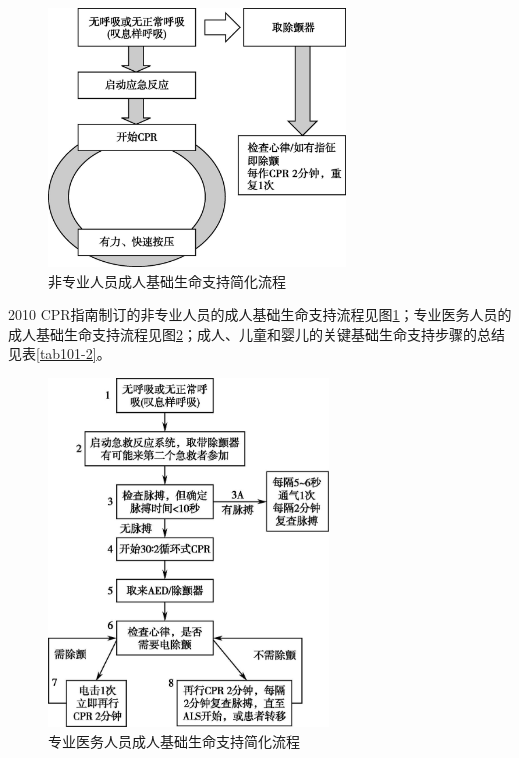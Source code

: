 \begin{figure}[!htbp]
 \centering
 \includegraphics[width=3.10417in,height=2.69792in]{./images/Image00409.jpg}
 \captionsetup{justification=centering}
 \caption{非专业人员成人基础生命支持简化流程}
 \label{fig101-6}
  \end{figure} 

2010
CPR指南制订的非专业人员的成人基础生命支持流程见图\ref{fig101-6}；专业医务人员的成人基础生命支持流程见图\ref{fig101-7}；成人、儿童和婴儿的关键基础生命支持步骤的总结见表\ref{tab101-2}。

\begin{figure}[!htbp]
 \centering
 \includegraphics[width=2.92708in,height=3.63542in]{./images/Image00410.jpg}
 \captionsetup{justification=centering}
 \caption{专业医务人员成人基础生命支持简化流程}
 \label{fig101-7}
  \end{figure} 

